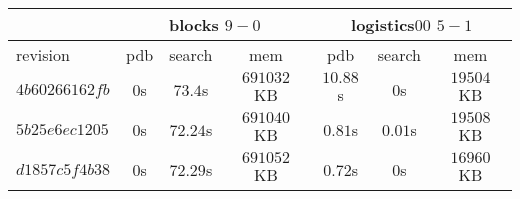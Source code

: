 \documentclass[a4paper,12pt]{scrartcl}
\begin{document}
\begin{tabular}{|l|c|c|c|c|c|c|}\hline
& \multicolumn{3}{c|}{blocks $9-0$} & \multicolumn{3}{c|}{logistics$00$ $5-1$}\\\hline
revision & pdb & search & mem & pdb & search & mem\\\hline
$4b60266162fb$ & $0$s & $73.4$s & $691032$ KB & $10.88$s & $0$s & $19504$ KB\\\hline
$5b25e6ec1205$ & $0$s & $72.24$s & $691040$ KB & $0.81$s & $0.01$s & $19508$ KB\\\hline
$d1857c5f4b38$ & $0$s & $72.29$s & $691052$ KB & $0.72$s & $0$s & $16960$ KB\\\hline
\end{tabular}
\end{document}
